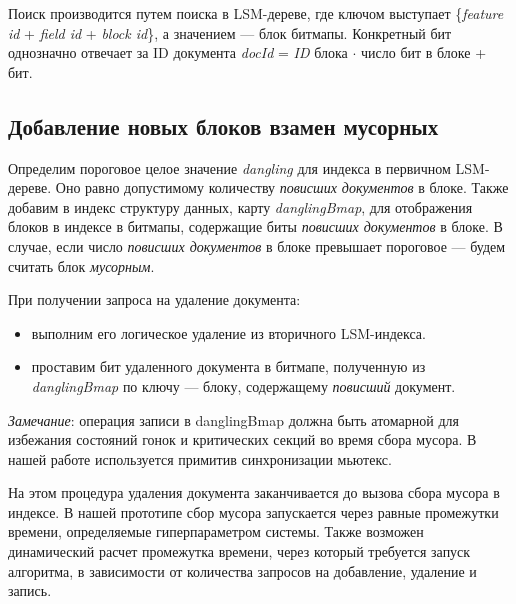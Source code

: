 Поиск производится путем поиска в LSM-дереве, где ключом выступает
\{\textit{feature id} + \textit{field id} + \textit{block id}\}, а значением — блок битмапы.
Конкретный бит однозначно отвечает за ID документа \textit{docId} = \textit{ID} блока
$\cdot$ число бит в блоке + бит.

\subsection{Добавление новых блоков взамен мусорных}

Определим пороговое целое значение \textit{dangling} для индекса в первичном
LSM-дереве. Оно равно допустимому количеству \textit{повисших документов} в
блоке. Также добавим в индекс структуру данных, карту \textit{danglingBmap}, для
отображения блоков в индексе в битмапы, содержащие биты \textit{повисших
документов} в блоке. В случае, если число \textit{повисших документов} в блоке
превышает пороговое — будем считать блок \textit{мусорным}.

При получении запроса на удаление документа:
\begin{itemize}
    \item выполним его логическое удаление из вторичного LSM-индекса.
    \item проставим бит удаленного документа в битмапе, полученную из
    \textit{danglingBmap} по ключу — блоку, содержащему \textit{повисший} документ.
\end{itemize}

\textit{Замечание}: операция записи в danglingBmap должна быть атомарной для 
избежания состояний гонок и критических секций во время сбора мусора. В нашей
работе используется примитив синхронизации мьютекс.

На этом процедура удаления документа заканчивается до вызова сбора мусора в индексе.
В нашей прототипе сбор мусора запускается через равные промежутки времени, определяемые 
гиперпараметром системы. Также возможен динамический расчет промежутка времени,
через который требуется запуск алгоритма, в зависимости от количества запросов на
добавление, удаление и запись.

